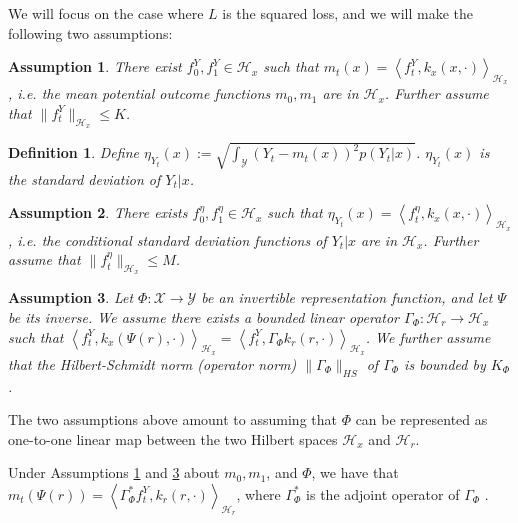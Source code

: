 \documentclass{article}
\newtheorem{thmappdef}{Definition}
\newtheorem{thmappasmp}{Assumption}
\def\cX{\mathcal X}
\def\cY{\mathcal Y}
\def\cH{\mathcal H}
\newcommand{\GP}{\Gamma_\Phi}
\begin{document}
We will focus on the case where $L$ is the squared loss, and we will make the following two assumptions:

\begin{thmappasmp}\label{asmp:yinrkhs}
There exist $f^Y_0,f^Y_1 \in \cH_x$ such that $m_t(x) = \left<f^Y_t,k_x(x,\cdot)\right>_{\cH_x}$, i.e.
the mean potential outcome functions $m_0,m_1$ are in $\cH_x$.   Further assume that $\|f^Y_t\|_{\cH_x} \leq K$.
\end{thmappasmp}

\begin{thmappdef}\label{def:eta}
Define $\eta_{Y_t}(x) :=\sqrt{\int_\cY \left(Y_t - m_t(x)\right)^2 p(Y_t|x)}$. $\eta_{Y_t}(x)$ is the standard deviation of $Y_t|x$.
\end{thmappdef}

\begin{thmappasmp}\label{asmp:etainrkhs}
There exists $f^\eta_0, f^\eta_1 \in \cH_x$ such that $\eta_{Y_t}(x) = \left<f^\eta_t,k_x(x,\cdot)\right>_{\cH_x}$, i.e. the conditional standard deviation functions of $Y_t|x$ are in $\cH_x$. Further assume that $\|f^\eta_t\|_{\cH_x} \leq M$.
\end{thmappasmp}
\begin{thmappasmp}\label{asmp:phiinrkhs}
Let $\Phi: \cX \rightarrow \cY$ be an invertible representation function, and let $\Psi$ be its inverse.
We assume there exists a bounded linear operator $\GP: \cH_r \rightarrow \cH_x$ such that $\left<f^Y_t,k_x(\Psi(r),\cdot)\right>_{\cH_x} = \left<f^Y_t,\GP k_r(r,\cdot)\right>_{\cH_x}$. We further assume that the Hilbert-Schmidt norm (operator norm) $\|\GP\|_{HS}$ of $\GP$ is bounded by $K_\Phi$.
\end{thmappasmp}

The two assumptions above amount to assuming that $\Phi$ can be represented as one-to-one linear map between the two Hilbert spaces $\cH_x$ and $\cH_r$.

Under Assumptions \ref{asmp:yinrkhs} and \ref{asmp:phiinrkhs} about $m_0,m_1$, and $\Phi$, we have that $m_t(\Psi(r)) = \left<\GP^* f^Y_t, k_r(r,\cdot)\right>_{\cH_r}$, where $\GP^*$ is the adjoint operator of $\GP$ \cite{grunewalder2013smooth}.
\end{document}

